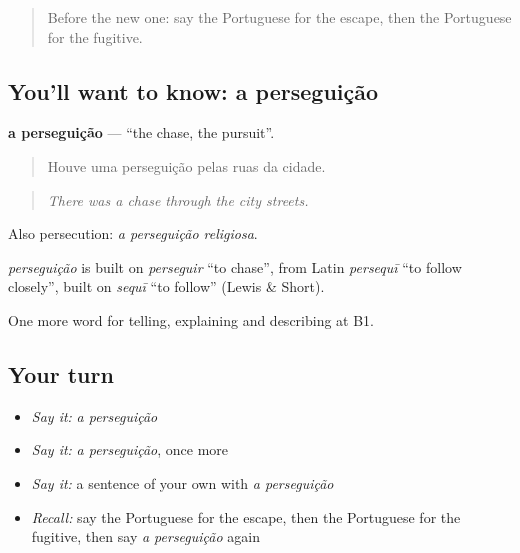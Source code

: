 \label{lesson:PT-C292-perseguicao}



\begin{quote}
Before the new one: say the Portuguese for the escape, then the Portuguese for the fugitive.
\end{quote}

\subsection*{You'll want to know: a perseguição}
\textbf{a perseguição} — \textquotedblleft{}the chase, the pursuit\textquotedblright{}.

\begin{quote}
Houve uma perseguição pelas ruas da cidade.
\end{quote}

\begin{quote}
\emph{There was a chase through the city streets.}
\end{quote}

Also persecution: \emph{a perseguição religiosa}.

\begin{cousinweb}
\emph{perseguição} is built on \emph{perseguir} \textquotedblleft{}to chase\textquotedblright{}, from Latin \emph{persequī} \textquotedblleft{}to follow closely\textquotedblright{}, built on \emph{sequī} \textquotedblleft{}to follow\textquotedblright{} (Lewis \& Short).
\end{cousinweb}

\begin{grammarlens}[title={What you've built}]
One more word for telling, explaining and describing at B1.
\end{grammarlens}

\subsection*{Your turn}
\begin{itemize}
\raggedright
  \item \emph{Say it:} \emph{a perseguição}
  \item \emph{Say it:} \emph{a perseguição}, once more
  \item \emph{Say it:} a sentence of your own with \emph{a perseguição}
  \item \emph{Recall:} say the Portuguese for the escape, then the Portuguese for the fugitive, then say \emph{a perseguição} again
\end{itemize}

